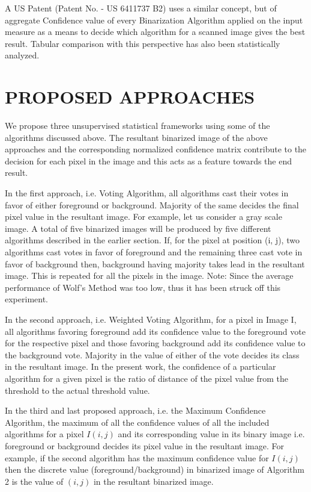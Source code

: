 \documentclass[conference]{IEEEtran}
\begin{document}
A US Patent (Patent No. - US 6411737 B2)\cite{uspatent} uses a similar concept, but of aggregate Confidence value of every Binarization Algorithm applied on the input measure as a means to decide which algorithm for a scanned image gives the best result. Tabular comparison with this perspective has also been statistically analyzed.

\section{PROPOSED APPROACHES}
We propose three unsupervised statistical frameworks using some of the algorithms discussed above. The resultant binarized image of the above approaches and the corresponding normalized confidence matrix contribute to the decision for each pixel in the image and this acts as a feature towards the end result.

In the first approach, i.e. Voting Algorithm, all algorithms cast their votes in favor of either foreground or background. Majority of the same decides the final pixel value in the resultant image. For example, let us consider a gray scale image. A total of five binarized images will be produced by five different algorithms described in the earlier section. If, for the pixel at position (i, j), two algorithms cast votes in favor of foreground and the remaining three cast vote in favor of background then, background having majority takes lead in the resultant image. This is repeated for all the pixels in the image. Note: Since the average performance of Wolf's Method \cite{wolf2003extraction} was too low, thus it has been struck off this experiment.

In the second approach, i.e. Weighted Voting Algorithm, for a pixel in Image I, all algorithms favoring foreground add its confidence value to the foreground vote for the respective pixel and those favoring background add its confidence value to the background vote. Majority in the value of either of the vote decides its class in the resultant image. In the present work, the confidence of a particular algorithm for a given pixel is the ratio of distance of the pixel value from the threshold to the actual threshold value.

In the third and last proposed approach, i.e. the Maximum Confidence Algorithm, the maximum of all the confidence values of all the included algorithms for a pixel $I(i,j)$ and its corresponding value in its binary image i.e. foreground or background decides its pixel value in the resultant image. For example, if the second algorithm has the maximum confidence value for $I(i,j)$ then the discrete value (foreground/background) in binarized image of Algorithm 2 is the value of $(i,j)$ in the resultant binarized image.
\end{document}
